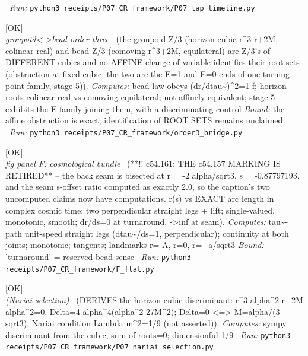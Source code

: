\begin{description}
\ \emph{Run:} \texttt{python3 receipts/P07\_CR\_framework/P07\_lap\_timeline.py}
\item[\rcptlabel{order3_bridge}{P7R6}\textbf{P7R6}\quad\texttt{order3\_bridge}]\hfill\textsf{[OK]}\\
\textit{groupoid<->bead order-three} \ (the groupoid Z/3 (horizon cubic r\textasciicircum{}3-r+2M, colinear real) and bead Z/3 (comoving r\textasciicircum{}3+2M, equilateral) are Z/3's of DIFFERENT cubics and no AFFINE change of variable identifies their root sets (obstruction at fixed cubic; the two are the E=1 and E=0 ends of one turning-point family, stage 5)). 
\emph{Computes:} bead law obeys (dr/dtau\textasciitilde{})\textasciicircum{}2=1-f; horizon roots colinear-real vs comoving equilateral; not affinely equivalent; stage 5 exhibits the E-family joining them, with a discriminating control
 \emph{Bound:} the affine obstruction is exact; identification of ROOT SETS remains unclaimed
\ \emph{Run:} \texttt{python3 receipts/P07\_CR\_framework/order3\_bridge.py}
\item[\rcptlabel{F_flat}{P7R7}\textbf{P7R7}\quad\texttt{F\_flat}]\hfill\textsf{[OK]}\\
\textit{fig panel F: cosmological bundle} \ (**!! c54.161: THE c54.157 MARKING IS RETIRED** -- the back seam is bisected at r = -2 alpha/sqrt3, s = -0.87797193, and the seam s-offset ratio computed as exactly 2.0, so the caption's two uncomputed claims now have computations. r(s) vs EXACT arc length in complex cosmic time: two perpendicular straight legs + lift; single-valued, monotonic, smooth; dr/ds=0 at turnaround, ->inf at seam). 
\emph{Computes:} tau\textasciitilde{}-path unit-speed straight legs (\textbar{}dtau\textasciitilde{}/ds\textbar{}=1, perpendicular); continuity at both joints; monotonic; tangents; landmarks r=-A, r=0, r=+a/sqrt3
 \emph{Bound:} 'turnaround' = reserved bead sense
\ \emph{Run:} \texttt{python3 receipts/P07\_CR\_framework/F\_flat.py}
\item[\rcptlabel{P07_nariai_selection}{P7R8}\textbf{P7R8}\quad\texttt{P07\_nariai\_selection}]\hfill\textsf{[OK]}\\
\textit{(Nariai selection)} \ (DERIVES the horizon-cubic discriminant: r\textasciicircum{}3-alpha\textasciicircum{}2 r+2M alpha\textasciicircum{}2=0, Delta=4 alpha\textasciicircum{}4(alpha\textasciicircum{}2-27M\textasciicircum{}2); Delta=0 <=> M=alpha/(3 sqrt3), Nariai condition Lambda m\textasciicircum{}2=1/9 (not asserted)). 
\emph{Computes:} sympy discriminant from the cubic; sum of roots=0; dimensionful 1/9
\ \emph{Run:} \texttt{python3 receipts/P07\_CR\_framework/P07\_nariai\_selection.py}

\end{description}
